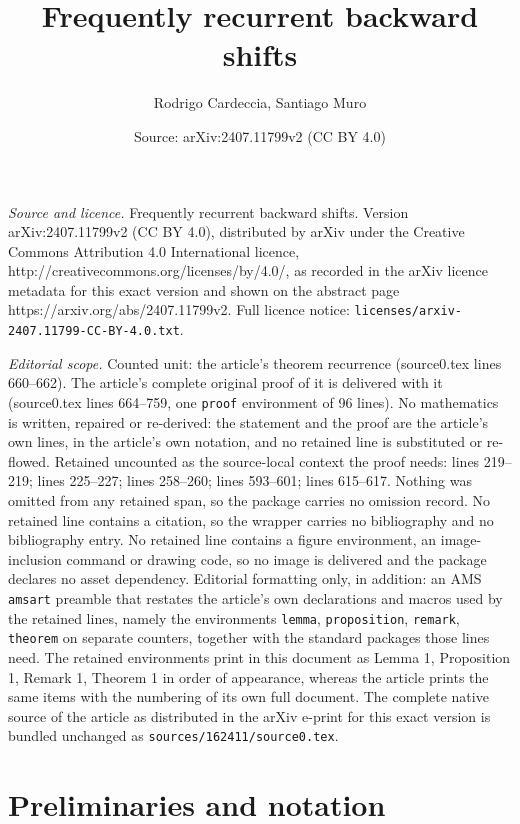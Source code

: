 \documentclass[10pt,a4paper]{amsart}
\title{Frequently recurrent backward shifts}
\author{Rodrigo Cardeccia, Santiago Muro}
\date{Source: arXiv:2407.11799v2 (CC BY 4.0)}
\begin{document}
\maketitle

\noindent\emph{Source and licence.} Frequently recurrent backward shifts. Version arXiv:2407.11799v2 (CC BY 4.0), distributed by arXiv under the Creative Commons Attribution 4.0 International licence, http://creativecommons.org/licenses/by/4.0/, as recorded in the arXiv licence metadata for this exact version and shown on the abstract page https://arxiv.org/abs/2407.11799v2. Full licence notice: \texttt{licenses/arxiv-2407.11799-CC-BY-4.0.txt}.\par\smallskip

\noindent\textit{Editorial scope.} Counted unit: the article's theorem recurrence (source0.tex lines 660--662). The article's complete original proof of it is delivered with it (source0.tex lines 664--759, one \texttt{proof} environment of 96 lines). No mathematics is written, repaired or re-derived: the statement and the proof are the article's own lines, in the article's own notation, and no retained line is substituted or re-flowed.  Retained uncounted as the source-local context the proof needs: lines 219--219; lines 225--227; lines 258--260; lines 593--601; lines 615--617.  Nothing was omitted from any retained span, so the package carries no omission record.  No retained line contains a citation, so the wrapper carries no bibliography and no bibliography entry.  No retained line contains a figure environment, an image-inclusion command or drawing code, so no image is delivered and the package declares no asset dependency.  Editorial formatting only, in addition: an AMS \texttt{amsart} preamble that restates the article's own declarations and macros used by the retained lines, namely the environments \texttt{lemma}, \texttt{proposition}, \texttt{remark}, \texttt{theorem} on separate counters, together with the standard packages those lines need.  The retained environments print in this document as Lemma 1, Proposition 1, Remark 1, Theorem 1 in order of appearance, whereas the article prints the same items with the numbering of its own full document.  The complete native source of the article as distributed in the arXiv e-print for this exact version is bundled unchanged as \texttt{sources/162411/source0.tex}.
\section{Preliminaries and notation}\label{preliminaries}
\end{document}
